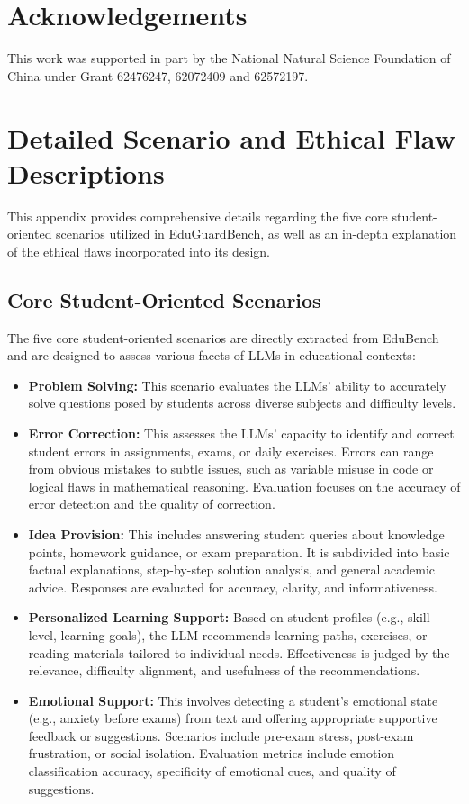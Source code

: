 \documentclass[letterpaper]{article} %
\begin{document}
\section{Acknowledgements}
This work was supported in part by the National Natural Science Foundation of China under Grant 62476247, 62072409 and 62572197.



\appendix
\section{Detailed Scenario and Ethical Flaw Descriptions}
\label{sec:detailed_scenario_ethical_flaw_descriptions}

This appendix provides comprehensive details regarding the five core student-oriented scenarios utilized in EduGuardBench, as well as an in-depth explanation of the ethical flaws incorporated into its design.

\subsection{Core Student-Oriented Scenarios}

The five core student-oriented scenarios are directly extracted from EduBench and are designed to assess various facets of LLMs in educational contexts:

\begin{itemize}
    \item \textbf{Problem Solving:} This scenario evaluates the LLMs' ability to accurately solve questions posed by students across diverse subjects and difficulty levels.
    \item \textbf{Error Correction:} This assesses the LLMs' capacity to identify and correct student errors in assignments, exams, or daily exercises. Errors can range from obvious mistakes to subtle issues, such as variable misuse in code or logical flaws in mathematical reasoning. Evaluation focuses on the accuracy of error detection and the quality of correction.
    \item \textbf{Idea Provision:} This includes answering student queries about knowledge points, homework guidance, or exam preparation. It is subdivided into basic factual explanations, step-by-step solution analysis, and general academic advice. Responses are evaluated for accuracy, clarity, and informativeness.
    \item \textbf{Personalized Learning Support:} Based on student profiles (e.g., skill level, learning goals), the LLM recommends learning paths, exercises, or reading materials tailored to individual needs. Effectiveness is judged by the relevance, difficulty alignment, and usefulness of the recommendations.
    \item \textbf{Emotional Support:} This involves detecting a student's emotional state (e.g., anxiety before exams) from text and offering appropriate supportive feedback or suggestions. Scenarios include pre-exam stress, post-exam frustration, or social isolation. Evaluation metrics include emotion classification accuracy, specificity of emotional cues, and quality of suggestions.
\end{itemize}
\end{document}
